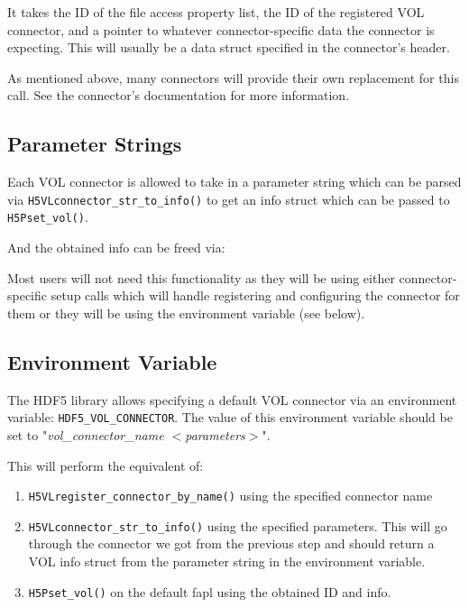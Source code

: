 \quad{}

It takes the ID of the file access property list, the ID of the registered VOL connector, and a pointer to whatever connector-specific data the connector is expecting. This will usually be a data struct specified in the connector's header.

As mentioned above, many connectors will provide their own replacement for this call. See the connector's documentation for more information.

\subsection{Parameter Strings}

Each VOL connector is allowed to take in a parameter string which can be parsed via {\tt H5VLconnector\_str\_to\_info()} to get an info struct which can be passed to {\tt H5Pset\_vol()}.

\quad{}

And the obtained info can be freed via:

\quad{}

Most users will not need this functionality as they will be using either connector-specific setup calls which will handle registering and configuring the connector for them or they will be using the environment variable (see below).

\subsection{Environment Variable}

The HDF5 library allows specifying a default VOL connector via an environment variable: {\tt HDF5\_VOL\_CONNECTOR}. The value of this environment variable should be set to "\textit{vol\_connector\_name $<$parameters$>$}".

This will perform the equivalent of:

\begin{enumerate}
    \item {\tt H5VLregister\_connector\_by\_name()} using the specified connector name
    \item {\tt H5VLconnector\_str\_to\_info()} using the specified parameters. This will go through the connector we got from the previous step and should return a VOL info struct from the parameter string in the environment variable.
    \item {\tt H5Pset\_vol()} on the default fapl using the obtained ID and info.
\end{enumerate}

